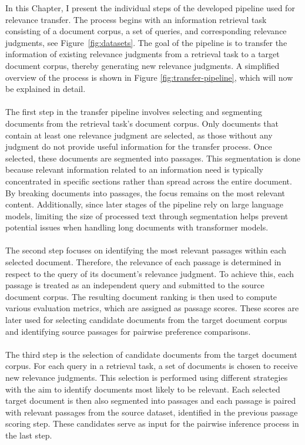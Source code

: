 In this Chapter, I present the individual steps of the developed pipeline used for relevance transfer. The process begins with an information retrieval task consisting of a document corpus, a set of queries, and corresponding relevance judgments, see Figure~\ref{fig:datasets}. The goal of the pipeline is to transfer the information of existing relevance judgments from a retrieval task to a target document corpus, thereby generating new relevance judgments. A simplified overview of the process is shown in Figure \ref{fig:transfer-pipeline}, which will now be explained in detail.
\\\\
The first step in the transfer pipeline involves selecting and segmenting documents from the retrieval task's document corpus. Only documents that contain at least one relevance judgment are selected, as those without any judgment do not provide useful information for the transfer process. Once selected, these documents are segmented into passages. This segmentation is done because relevant information related to an information need is typically concentrated in specific sections rather than spread across the entire document. By breaking documents into passages, the focus remains on the most relevant content. Additionally, since later stages of the pipeline rely on large language models, limiting the size of processed text through segmentation helps prevent potential issues when handling long documents with transformer models.
\\\\
The second step focuses on identifying the most relevant passages within each selected document. Therefore, the relevance of each passage is determined in respect to the query of its document's relevance judgment. To achieve this, each passage is treated as an independent query and submitted to the source document corpus. The resulting document ranking is then used to compute various evaluation metrics, which are assigned as passage scores. These scores are later used for selecting candidate documents from the target document corpus and identifying source passages for pairwise preference comparisons.
\\\\
The third step is the selection of candidate documents from the target document corpus. For each query in a retrieval task, a set of documents is chosen to receive new relevance judgments. This selection is performed using different strategies with the aim to identify documents most likely to be relevant. Each selected target document is then also segmented into passages and each passage is paired with relevant passages from the source dataset, identified in the previous passage scoring step. These candidates serve as input for the pairwise inference process in the last step.
